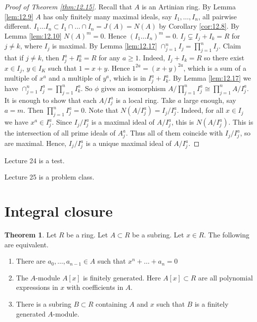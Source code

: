 \documentclass{article}
\newcommand{\rb}[1]{\left( #1 \right)}
\renewcommand{\sb}[1]{\left[ #1 \right]}
\theoremstyle{definition}\newtheorem{definition}{Definition}[section]
\theoremstyle{definition}\newtheorem{remark}[definition]{Remark}
\theoremstyle{definition}\newtheorem*{example}{Example}
\theoremstyle{definition}\newtheorem*{note}{Note}
\newtheorem{theorem}[definition]{Theorem}
\begin{document}
\begin{proof}[Proof of Theorem \ref{thm:12.15}]
Recall that $ A $ is an Artinian ring. By Lemma \ref{lem:12.9} $ A $ has only finitely many maximal ideals, say $ I_1, \dots, I_n $, all pairwise different. $ I_1 \dots I_n \subset I_1 \cap \dots \cap I_n = J\rb{A} = N\rb{A} $ by Corollary \ref{cor:12.8}. By Lemma \ref{lem:12.10} $ N\rb{A}^m = 0 $. Hence $ \rb{I_1 \dots I_n}^m = 0 $. $ I_j \subsetneq I_j + I_k = R $ for $ j \ne k $, where $ I_j $ is maximal. By Lemma \ref{lem:12.17} $ \cap_{j = 1}^n I_j = \prod_{j = 1}^n I_j $. Claim that if $ j \ne k $, then $ I_j^a + I_k^a = R $ for any $ a \ge 1 $. Indeed, $ I_j + I_k = R $ so there exist $ x \in I_j $, $ y \in I_K $ such that $ 1 = x + y $. Hence $ 1^{2a} = \rb{x + y}^{2a} $, which is a sum of a multiple of $ x^a $ and a multiple of $ y^a $, which is in $ I_j^a + I_k^a $. By Lemma \ref{lem:12.17} we have $ \cap_{j = 1}^n I_j^a = \prod_{j = 1}^n I_k^a $. So $ \phi $ gives an isomorphism $ A / \prod_{j = 1}^n I_j^a \cong \prod_{j = 1}^n A / I_j^a $. It is enough to show that each $ A / I_j^a $ is a local ring. Take $ a $ large enough, say $ a = m $. Then $ \prod_{j = 1}^n I_j^a = 0 $. Note that $ N\rb{A / I_j^a} = I_j / I_j^a $. Indeed, for all $ x \in I_j $ we have $ x^a \in I_j^a $. Since $ I_j / I_j^a $ is a maximal ideal of $ A / I_j^a $, this is $ N\rb{A / I_j^a} $. This is the intersection of all prime ideals of $ A_j^a $. Thus all of them coincide with $ I_j / I_j^a $, so are maximal. Hence, $ I_j / I_j^a $ is a unique maximal ideal of $ A / I_j^a $.
\end{proof}


Lecture 24 is a test.


Lecture 25 is a problem class.


\section{Integral closure}

\begin{theorem}
\label{thm:13.1}
Let $ R $ be a ring. Let $ A \subset R $ be a subring. Let $ x \in R $. The following are equivalent.
\begin{enumerate}
\item There are $ a_0, \dots, a_{n - 1} \in A $ such that $ x^n + \dots + a_n = 0 $
\item The $ A $-module $ A\sb{x} $ is finitely generated. Here $ A\sb{x} \subset R $ are all polynomial expressions in $ x $ with coefficients in $ A $.
\item There is a subring $ B \subset R $ containing $ A $ and $ x $ such that $ B $ is a finitely generated $ A $-module.
\end{enumerate}
\end{theorem}
\end{document}
